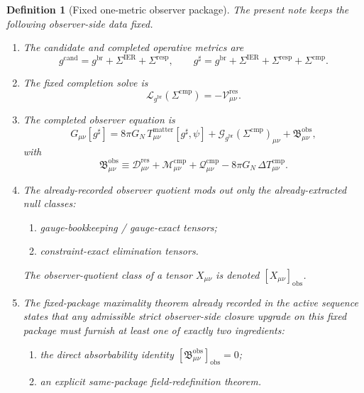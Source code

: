 \documentclass[11pt]{article}
\newcommand{\ObserverMetric}{g^{\mathrm{br}}}
\newcommand{\CandidateMetric}{g^{\mathrm{cand}}}
\newcommand{\CompletedMetric}{g^{\sharp}}
\newcommand{\BaseShift}{\Sigma^{\mathrm{IER}}}
\newcommand{\ResponseShift}{\Sigma^{\mathrm{resp}}}
\newcommand{\CompShift}{\Sigma^{\mathrm{cmp}}}
\newcommand{\ResidualCore}{\mathcal V_{\mu\nu}^{\mathrm{res}}}
\newcommand{\ResidualDec}{\mathcal D_{\mu\nu}^{\mathrm{res}}}
\newcommand{\ReducedEin}{\mathcal L_{\ObserverMetric}}
\newcommand{\GaugeBook}{\mathcal G_{\ObserverMetric}}
\newcommand{\CompMix}{\mathcal M_{\mu\nu}^{\mathrm{cmp}}}
\newcommand{\CompQuad}{\mathcal Q_{\mu\nu}^{\mathrm{cmp}}}
\newcommand{\DeltaTComp}{\Delta T_{\mu\nu}^{\mathrm{cmp}}}
\newcommand{\ObsBurden}{\mathfrak B_{\mu\nu}^{\mathrm{obs}}}
\newcommand{\ObserverClass}[1]{\left[#1\right]_{\mathrm{obs}}}
\newtheorem{definition}{Definition}
\begin{document}
\begin{definition}[Fixed one-metric observer package]
\label{def:fixed}
The present note keeps the following observer-side data fixed.
\begin{enumerate}
    \item The candidate and completed operative metrics are
    \begin{equation}
    \CandidateMetric
    =
    \ObserverMetric+\BaseShift+\ResponseShift,
    \qquad
    \CompletedMetric
    =
    \ObserverMetric+\BaseShift+\ResponseShift+\CompShift.
    \label{eq:metrics}
    \end{equation}
    \item The fixed completion solve is
    \begin{equation}
    \ReducedEin(\CompShift)=-\ResidualCore.
    \label{eq:solve}
    \end{equation}
    \item The completed observer equation is
    \begin{equation}
    G_{\mu\nu}[\CompletedMetric]
    =
    8\pi G_N\,T_{\mu\nu}^{\mathrm{matter}}[\CompletedMetric,\psi]
    +\GaugeBook(\CompShift)_{\mu\nu}
    +\ObsBurden,
    \label{eq:completed}
    \end{equation}
    with
    \begin{equation}
    \ObsBurden
    \equiv
    \ResidualDec+\CompMix+\CompQuad-8\pi G_N\,\DeltaTComp.
    \label{eq:burden}
    \end{equation}
    \item The already-recorded observer quotient mods out only the already-extracted null classes:
    \begin{enumerate}
        \item gauge-bookkeeping / gauge-exact tensors;
        \item constraint-exact elimination tensors.
    \end{enumerate}
    The observer-quotient class of a tensor \(X_{\mu\nu}\) is denoted \(\ObserverClass{X_{\mu\nu}}\).
    \item The fixed-package maximality theorem already recorded in the active sequence states that any admissible strict observer-side closure upgrade on this fixed package must furnish at least one of exactly two ingredients:
    \begin{enumerate}
        \item the direct absorbability identity \(\ObserverClass{\ObsBurden}=0\);
        \item an explicit same-package field-redefinition theorem.
    \end{enumerate}
\end{enumerate}
\end{definition}
\end{document}
